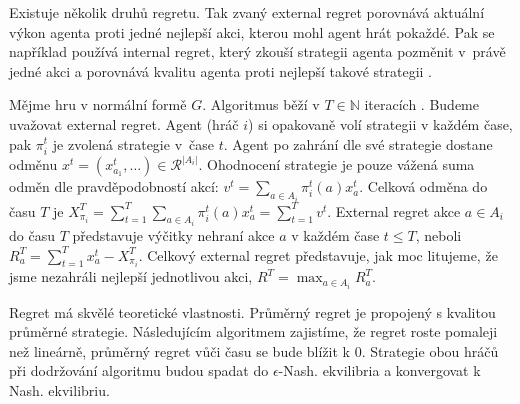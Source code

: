 Existuje několik druhů regretu. Tak zvaný external regret porovnává aktuální výkon agenta proti jedné nejlepší akci, kterou mohl agent hrát pokaždé. Pak se například používá internal regret, který zkouší strategii agenta pozměnit v~právě jedné akci a porovnává kvalitu agenta proti nejlepší takové strategii \cite{Balko}.  %

Mějme hru v normální formě $G$. Algoritmus běží v $T \in \mathbb{N}$ iteracích . Budeme uvažovat external regret. Agent (hráč $i$) si opakovaně volí strategii v každém čase, pak $\pi_i^t$ je zvolená strategie v~čase $t$. Agent po zahrání dle své strategie dostane odměnu $x^t = (x^t_{a_1}, \ldots) \in \mathcal{R}^{|A_i|}$. Ohodnocení strategie je pouze vážená suma odměn dle pravděpodobností akcí: $v^t = \sum_{a \in A_i} \pi_i^t(a)x^t_a$. Celková odměna do času $T$ je $X^T_{\pi_i} = \sum_{t=1}^T \sum_{a \in A_i} \pi_i^t(a)x^t_a = \sum_{t=1}^T v^t$. External regret akce $a \in A_i$ do času $T$ představuje výčitky nehraní akce $a$ v každém čase $t \leq T$, neboli $R_a^T = \sum_{t=1}^T x^t_a - X_{\pi_i}^T$. Celkový external regret představuje, jak moc litujeme, že jsme nezahráli nejlepší jednotlivou akci, $R^T = \max_{a \in A_i} R_a^T$.

Regret má skvělé teoretické vlastnosti. Průměrný regret je propojený s kvalitou průměrné strategie. Následujícím algoritmem zajistíme, že regret roste pomaleji než lineárně, průměrný regret vůči času se bude blížit k 0. Strategie obou hráčů při dodržování algoritmu budou spadat do $\epsilon$-Nash. ekvilibria a konvergovat k Nash. ekvilibriu.






